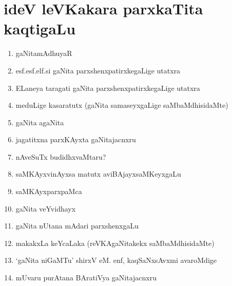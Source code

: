 \chapter{ideV leVKakara parxkaTita kaqtigaLu}

\begin{enumerate}
\renewcommand{\labelenumi}{\rm \theenumi)}
\itemsep=2pt
\item gaNitamAdhuyaR
  
\item esf.esf.elf.si gaNita parxshenxpatirxkegaLige utatxra

\item ELaneya taragati gaNita parxshenxpatirxkegaLige utatxra

\item meduLige kasaratutx (gaNita samaseyxgaLige saMbaMdhisidaMte)

\item gaNita agaNita

\item jagatitxna parxKAyxta gaNitajacnxru

\item nAveSuTx budidhxvaMtaru?

\item saMKAyxvinAyxsa matutx aviBAjayxsaMKeyxgaLu 

\item saMKAyxparxpaMca

\item gaNita veYvidhayx

\item gaNita nUtana mAdari parxshenxgaLu

\item makakxLa keYcaLaka (reVKAgaNitakekx saMbaMdhisidaMte)

\item `gaNita niGaMTu' shirxV eM. enf, kaqSaNxsAvxmi avaroMdige  
  
\item mUvaru purAtana BAratiVya gaNitajacnxru  

{\fontsize{11}{13}}
  
\end{enumerate}
